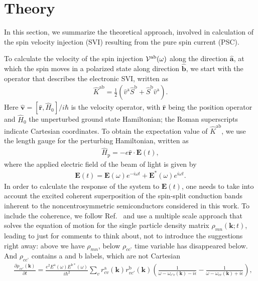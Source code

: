 \documentclass[floatfix,prb,aps,superscriptaddress,showpacs,11pt,preprint,letterpaper]{revtex4}
\begin{document}
\section{Theory}
\label{sec:theory}

In this section, we  summarize the theoretical approach, involved in
calculation of the spin velocity injection (SVI) resulting from the pure spin
current (PSC).
 
To calculate the velocity of the spin injection
${\cal V}^{\mathrm{a}\mathrm{b}}(\omega)$ along the direction $\hat{\mathbf{a}}$, at
which the spin moves in a
polarized state along direction $\hat{\mathbf{b}}$,
we start with the operator that describes the electronic SVI, written as
\begin{align}\label{z.1}
\hat K^{\mathrm{a}\mathrm{b}} = 
\frac{1}{2}\left( \hat v^\mathrm{a} \hat S^\mathrm{b} 
+\hat  S^\mathrm{b} \hat v^\mathrm{a}\right) 
.
\end{align} 
Here $\hat{\mathbf v}=[\hat{\mathbf r},\hat H_0]/i\hbar$ 
is the velocity operator, with
$\hat {\mathbf r}$ 
being the position operator and $\hat H_0$ the unperturbed
ground state Hamiltonian; 
the Roman superscripts  indicate Cartesian coordinates. 
To obtain the expectation value of 
$\hat K^{\mathrm{a}\mathrm{b}}$, we use the length gauge for the perturbing
Hamiltonian, written as
\begin{align}\label{z.2}
\hat H_{\text{p}}=-e\hat{\mathbf r}\cdot{\mathbf E}(t)
,
\end{align}   
where the applied electric field of the beam of light is given by
\begin{align}\label{z.3}
{\mathbf E}(t) = 
{\mathbf E}(\omega)e^{-i\omega t} + {\mathbf E}^*(\omega)e^{i\omega t}
.
\end{align}
In order to calculate the response of the system to ${\mathbf E}(t)$, one needs
to take into account the excited coherent superposition of the spin-split
conduction bands inherent to the noncentrosymmetric semiconductors considered
in this work. To include the coherence, we follow Ref.~
and use a multiple scale approach that solves the equation of motion for the
single particle density matrix ${\rho}_{mn}({\mathbf k};t)$, leading to
{\color{red} just for comments to think about, not to introduce the suggestions
right away: above we have $\rho_{mn}$, below $\rho_{cc’}$ time variable has
disappeared below. And $\rho_{cc’}$ contains a and b labels, which are not
Cartesian}
\begin{align}\label{z.4}
&\frac{\partial \rho_{cc'}({\mathbf k})}{\partial t} =
\frac{e^{2}E^{\mathrm{a}}(\omega)E^{\mathrm{b*}}(\omega)}
{i \hbar^{2}}
\sum_{v}r^{\mathrm{a}}_{cv}({\mathbf k}) r^{\mathrm{b}}_{vc'}({\mathbf k})
\left( \frac{1}{\omega - \omega_{c'v}({\mathbf k}) - i \epsilon} 
- 
\frac{1}{\omega - \omega_{cv}({\mathbf k}) + i \epsilon} \right)
,
\end{align}
\end{document}
